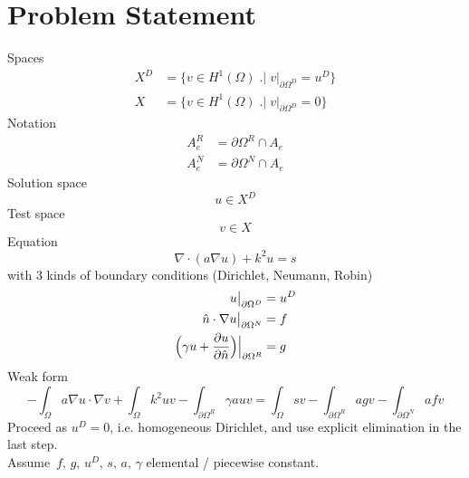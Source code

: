 \documentclass[a4paper,onecolumn]{article}
\begin{document}
\setcounter{page}{1}

\section{Problem Statement}
Spaces
\begin{equation*}\begin{split}
    X^D &= \{v\in H^1(\Omega) \;\bigl.\bigr|\; v|_{\partial \Omega^D} = u^D\}\\
    X &= \{v\in H^1(\Omega) \;\bigl.\bigr|\; v|_{\partial \Omega^D} = 0\}
\end{split}\end{equation*}
Notation
\begin{equation*}\begin{split}
    A_e^R &= \partial\Omega^R \cap A_e\\
    A_e^N &= \partial\Omega^N \cap A_e
\end{split}\end{equation*}
Solution space
$$
    u\in X^D
$$
Test space
$$
    v\in X
$$
Equation
\begin{equation*}
    \nabla \cdot (a \nabla u) + k^2 u = s
\end{equation*}
with 3 kinds of boundary conditions (Dirichlet, Neumann, Robin)
\begin{equation*}\begin{split}
    u\bigl.\bigr|_{\partial \Omega^D} &= u^D\\
    \hat{n} \cdot \nabla u \bigl.\bigr|_{\partial \Omega^N}&= f\\
    \Bigr(\gamma u + \frac{\partial u}{\partial \hat{n}} \Bigr)\Bigl.\Bigr|_{\partial \Omega^R}&= g
\end{split}\end{equation*}
Weak form
\begin{equation*}
    -\int_\Omega a \nabla u \cdot \nabla v + \int_\Omega k^2 u v 
    -\int_{\partial \Omega^R} \gamma a u v =  \int_\Omega s v
    - \int_{\partial \Omega^R} ag v
    - \int_{\partial \Omega^N} af v
\end{equation*}
Proceed as $u^D = 0$, i.e. homogeneous Dirichlet, and use explicit elimination in the last step.\\
Assume $\,f, \,g,\, u^D, \,s, \,a,\,\gamma$ elemental / piecewise constant.\\
\end{document}
